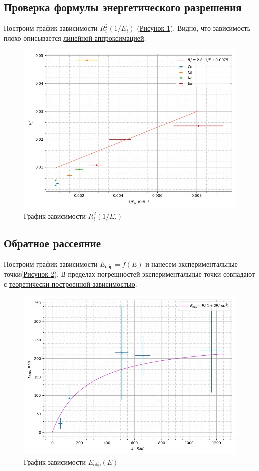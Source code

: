 \documentclass{article}
\begin{document}
\subsection{Проверка формулы энергетического разрешения}

Построим график зависимости $R_i^2(1/E_i)$ (\hyperref[R2_and_invE]{Рисунок \ref*{R2_and_invE}}). Видно, что зависимость плохо описывается \hyperref[Ri = c/E]{линейной аппроксимацией}. 
    
\begin{figure}[h!]
        \centering
        \includegraphics[width = 11 cm]{R(E).png}
        \caption{График зависимости $R_i^2(1/E_i)$}
        \label{R2_and_invE}
    \end{figure}
 



  
\subsection{Обратное рассеяние}

Построим график зависимости $ E_{обр} = f(E)$ и нанесем экспериментальные точки(\hyperref[E_obr]{Рисунок \ref*{E_obr}}). В пределах погрешностей экспериментальные точки совпадают с  \hyperref[Eobr]{теоретически построенной зависимостью}. 


\begin{figure}[h!]
        \centering
        \includegraphics[width = 10 cm]{E(E).png}
        \caption{График зависимости $E_{\text{обр}}(E)$}
        \label{E_obr}
    \end{figure}
\end{document}
